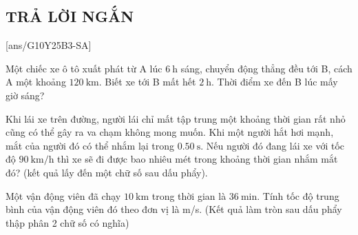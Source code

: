 \subsection{TRẢ LỜI NGẮN}
\setcounter{ex}{0}
[ans/G10Y25B3-SA]
\begin{ex}
	Một chiếc xe ô tô xuất phát từ A lúc $\SI{6}{\hour}$ sáng, chuyển động thẳng đều tới B, cách A một khoảng $\SI{120}{\kilo\meter}$. Biết xe tới B mất hết $\SI{2}{\hour}$. Thời điểm xe đến B lúc mấy giờ sáng?
\end{ex}

\begin{ex}
\end{ex}

\begin{ex}
	Khi lái xe trên đường, người lái chỉ mất tập trung một khoảng thời gian rất nhỏ cũng có thể gây ra va chạm không mong muốn. Khi một người hắt hơi mạnh, mắt của người đó có thể nhắm lại trong $\SI{0.50}{\second}$. Nếu người đó đang lái xe với tốc độ $\SI{90}{\kilo\meter/\hour}$ thì xe sẽ đi được bao nhiêu mét trong khoảng thời gian nhắm mắt đó? (kết quả lấy đến một chữ số sau dấu phẩy).
\end{ex}

\begin{ex}
	Một vận động viên đã chạy $\SI{10}{\kilo\meter}$ trong thời gian là $\SI{36}{\minute}$. Tính tốc độ trung bình của vận động viên đó theo đơn vị là \si{\meter/\second}. (Kết quả làm tròn sau dấu phẩy thập phân 2 chữ số có nghĩa)
\end{ex}

